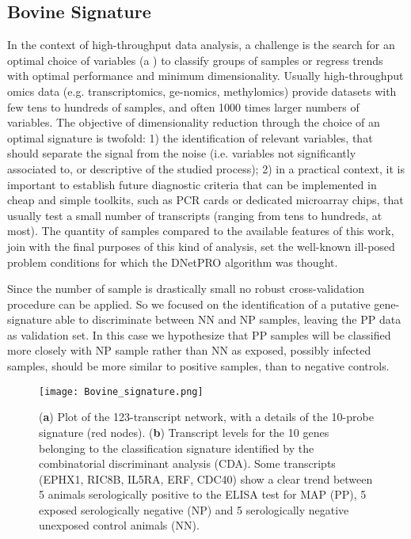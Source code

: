 \documentclass{standalone}
\begin{document}
\subsection[Results]{Bovine Signature}\label{bovine_result}

In the context of high-throughput data analysis, a challenge is the search for an optimal choice of variables (a ) to classify groups of samples or regress trends with optimal performance and minimum dimensionality.
Usually high-throughput omics data (e.g. transcriptomics, ge-nomics, methylomics) provide datasets with few tens to hundreds of samples, and often 1000 times larger numbers of variables.
The objective of dimensionality reduction through the choice of an optimal signature is twofold: 1) the identification of relevant variables, that should separate the signal from the noise (i.e. variables not significantly associated to, or descriptive of the studied process); 2) in a practical context, it is important to establish future diagnostic criteria that can be implemented in cheap and simple toolkits, such as PCR cards or dedicated microarray chips, that usually test a small number of transcripts (ranging from tens to hundreds, at most).
The quantity of samples compared to the available features of this work, join with the final purposes of this kind of analysis, set the well-known ill-posed problem conditions for which the DNetPRO algorithm was thought.

Since the number of sample is drastically small no robust cross-validation procedure can be applied.
So we focused on the identification of a putative gene-signature able to discriminate between NN and NP samples, leaving the PP data as validation set.
In this case we hypothesize that PP samples will be classified more closely with NP sample rather than NN as exposed, possibly infected samples, should be more similar to positive samples, than to negative controls.

\begin{figure}[htbp]
\centering
\texttt{[image: Bovine\_signature.png]}
\qquad\qquad
\def\svgwidth{0.45\textwidth}

\caption[Caption Bovine]{(\textbf{a}) Plot of the 123-transcript network, with a details of the 10-probe signature (red nodes)\footnotemark.
(\textbf{b}) Transcript levels for the 10 genes belonging to the classification signature identified by the combinatorial discriminant analysis (CDA).
Some transcripts (EPHX1, RIC8B, IL5RA, ERF, CDC40) show a clear trend  between 5 animals serologically positive to the ELISA test for MAP (PP), 5 exposed serologically negative (NP) and 5 serologically negative unexposed control animals (NN).
}
\label{fig:bovine_signature}
\end{figure}
\end{document}
